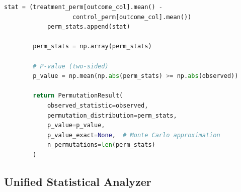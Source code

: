 \begin{lstlisting}[language=Python, caption={Permutation Hypothesis Testing}]
            stat = (treatment_perm[outcome_col].mean() -
                   control_perm[outcome_col].mean())
            perm_stats.append(stat)

        perm_stats = np.array(perm_stats)

        # P-value (two-sided)
        p_value = np.mean(np.abs(perm_stats) >= np.abs(observed))

        return PermutationResult(
            observed_statistic=observed,
            permutation_distribution=perm_stats,
            p_value=p_value,
            p_value_exact=None,  # Monte Carlo approximation
            n_permutations=len(perm_stats)
        )
\end{lstlisting}

\subsection{Unified Statistical Analyzer}

